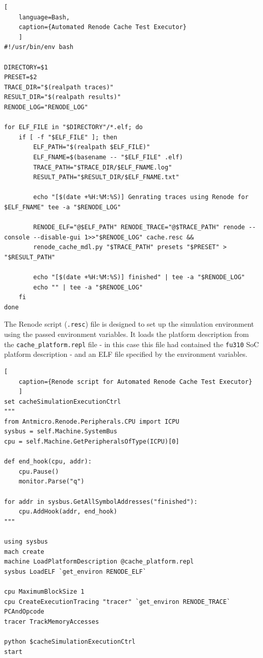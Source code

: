\begin{center}
\centering
\begin{minipage}{\linewidth}
\begin{lstlisting}[
    language=Bash,
    caption={Automated Renode Cache Test Executor}
    ]
#!/usr/bin/env bash

DIRECTORY=$1
PRESET=$2
TRACE_DIR="$(realpath traces)"
RESULT_DIR="$(realpath results)"
RENODE_LOG="RENODE_LOG"

for ELF_FILE in "$DIRECTORY"/*.elf; do
	if [ -f "$ELF_FILE" ]; then
		ELF_PATH="$(realpath $ELF_FILE)"
		ELF_FNAME=$(basename -- "$ELF_FILE" .elf)
		TRACE_PATH="$TRACE_DIR/$ELF_FNAME.log"
		RESULT_PATH="$RESULT_DIR/$ELF_FNAME.txt"

		echo "[$(date +%H:%M:%S)] Genrating traces using Renode for $ELF_FNAME" tee -a "$RENODE_LOG"

		RENODE_ELF="@$ELF_PATH" RENODE_TRACE="@$TRACE_PATH" renode --console --disable-gui 1>>"$RENODE_LOG" cache.resc &&
		renode_cache_mdl.py "$TRACE_PATH" presets "$PRESET" > "$RESULT_PATH"

		echo "[$(date +%H:%M:%S)] finished" | tee -a "$RENODE_LOG"
		echo "" | tee -a "$RENODE_LOG"
	fi
done
\end{lstlisting}
\end{minipage}
\end{center}

\noindent The Renode script (\texttt{.resc}) file is designed to set up the simulation environment using the passed environment variables. It loads the platform description from
the \texttt{cache\_platform.repl} file - in this case this file had contained the \texttt{fu310} SoC platform description - and an ELF file specified by the environment variables.


\begin{center}
\centering
\begin{minipage}{\linewidth}
\begin{lstlisting}[
    caption={Renode script for Automated Renode Cache Test Executor}
    ]
set cacheSimulationExecutionCtrl
"""
from Antmicro.Renode.Peripherals.CPU import ICPU
sysbus = self.Machine.SystemBus
cpu = self.Machine.GetPeripheralsOfType(ICPU)[0]

def end_hook(cpu, addr):
    cpu.Pause()
    monitor.Parse("q")

for addr in sysbus.GetAllSymbolAddresses("finished"):
    cpu.AddHook(addr, end_hook)
"""

using sysbus
mach create
machine LoadPlatformDescription @cache_platform.repl
sysbus LoadELF `get_environ RENODE_ELF`

cpu MaximumBlockSize 1
cpu CreateExecutionTracing "tracer" `get_environ RENODE_TRACE` PCAndOpcode
tracer TrackMemoryAccesses

python $cacheSimulationExecutionCtrl
start
\end{lstlisting}
\end{minipage}
\end{center}

